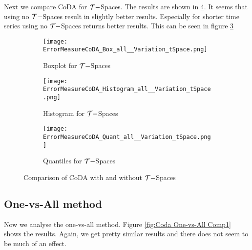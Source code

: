 Next we compare CoDA for $\mathcal{T}-$Spaces. The results are shown in \ref{fig:Coda T-Spaces Comp1}. It seems that using no $\mathcal{T}-$Spaces result in slightly better results. Especially for shorter time series using no $\mathcal{T}-$Spaces returns better results. This can be seen in figure \ref{fig:Coda T-Spaces Quant}

\begin{figure}[htb!]
\centering
\begin{subfigure}[b]{0.45\textwidth}
\texttt{[image: ErrorMeasureCoDA\_Box\_all\_\_Variation\_tSpace.png]}
\caption{Boxplot for $\mathcal{T}-$Spaces}
\label{fig:Coda T-Spaces Box}
\end{subfigure}
\hfill
\begin{subfigure}[b]{0.45\textwidth}
\texttt{[image: ErrorMeasureCoDA\_Histogram\_all\_\_Variation\_tSpace.png]}
\caption{Histogram for $\mathcal{T}-$Spaces}
\label{fig:Coda T-Spaces Hist}
\end{subfigure}
\hfill
\begin{subfigure}[b]{0.8\textwidth}
\texttt{[image: ErrorMeasureCoDA\_Quant\_all\_\_Variation\_tSpace.png]}
\caption{Quantiles for $\mathcal{T}-$Spaces}
\label{fig:Coda T-Spaces Quant}
\end{subfigure}
\caption{Comparison of CoDA with and without $\mathcal{T}-$Spaces}
\label{fig:Coda T-Spaces Comp1}
\end{figure}


\subsection{One-vs-All method}
\label{sec: One-vs-All}

Now we analyse the one-vs-all method. Figure \ref{fig:Coda One-vs-All Comp1} shows the results. Again, we get pretty similar results and there does not seem to be much of an effect. 

